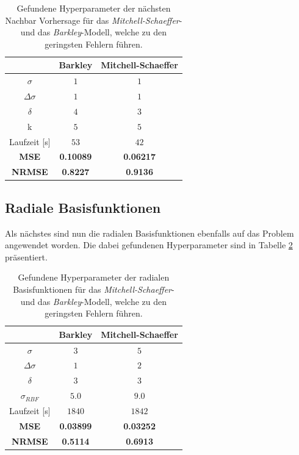 \begin{table}[h]
	\centering

	\begin{tabular}{|c|c|c|}
		\multicolumn{1}{c|}{} & Barkley & Mitchell-Schaeffer \\ 
		\hline \hline 
		\rule[-1ex]{0pt}{2.5ex} $\sigma$ & $1$ & $1$ \\ 
		\hline 
		\rule[-1ex]{0pt}{2.5ex} $\Delta \sigma$ & $1$ & $1$ \\ 
		\hline 
		\rule[-1ex]{0pt}{2.5ex} $\delta$ & $4$ & $3$ \\ 
		\hline 
		\rule[-1ex]{0pt}{2.5ex} k & $5$ & $5$ \\ 
		\hline 
		\rule[-1ex]{0pt}{2.5ex} Laufzeit [s] & $53$ & $42$ \\ 
		\hline 
		\rule[-1ex]{0pt}{2.5ex} \textbf{MSE} & \textbf{0.10089} & \textbf{0.06217} \\ 
		\hline 
		\rule[-1ex]{0pt}{2.5ex} \textbf{NRMSE} & \textbf{0.8227} & \textbf{0.9136} \\ 
		\hline 
	\end{tabular} 

	\caption{Gefundene Hyperparameter der nächsten Nachbar Vorhersage für das \textit{Mitchell-Schaeffer}- und das \textit{Barkley}-Modell, welche zu den geringsten Fehlern führen.}
\label{tab:exp_unblur_nn_results}
\end{table} 


\FloatBarrier
\subsection{Radiale Basisfunktionen}
Als nächstes sind nun die radialen Basisfunktionen ebenfalls auf das Problem angewendet worden. Die dabei gefundenen Hyperparameter sind in Tabelle \ref{tab:exp_unblur_rbf_results} präsentiert.

\begin{table}[h]
	\centering

	\begin{tabular}{|c|c|c|}
		\multicolumn{1}{c|}{} & Barkley & Mitchell-Schaeffer \\ 
		\hline \hline 
		\rule[-1ex]{0pt}{2.5ex} $\sigma$ & $3$ & $5$ \\ 
		\hline 
		\rule[-1ex]{0pt}{2.5ex} $\Delta \sigma$ & $1$ & $2$ \\ 
		\hline 
		\rule[-1ex]{0pt}{2.5ex} $\delta$ & $3$ & $3$ \\ 
		\hline 
		\rule[-1ex]{0pt}{2.5ex} $\sigma_{RBF}$ & $5.0$ & $9.0$ \\ 
		\hline 
		\rule[-1ex]{0pt}{2.5ex} Laufzeit [s] & $1840$ & $1842$ \\ 
		\hline 
		\rule[-1ex]{0pt}{2.5ex} \textbf{MSE} & \textbf{0.03899} & \textbf{0.03252} \\ 
		\hline 
		\rule[-1ex]{0pt}{2.5ex} \textbf{NRMSE} & \textbf{0.5114} & \textbf{0.6913} \\ 
		\hline 
	\end{tabular} 
	\caption{Gefundene Hyperparameter der radialen Basisfunktionen für das \textit{Mitchell-Schaeffer}- und das \textit{Barkley}-Modell, welche zu den geringsten Fehlern führen.}
	\label{tab:exp_unblur_rbf_results}
\end{table} 


